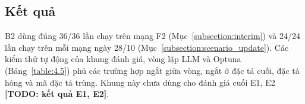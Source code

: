 \documentclass[../DoAn.tex]{subfiles}
\begin{document}
\subsection{Kết quả}

B2 dùng đúng 36/36 lần chạy trên mạng F2 (Mục~\ref{subsection:interim}) và 24/24 lần chạy trên mỗi mạng ngày 28/10 (Mục~\ref{subsection:scenario_update}). Các kiểm thử tự động của khung đánh giá, vòng lặp LLM và Optuna (Bảng~\ref{table:4.5}) phủ các trường hợp ngắt giữa vòng, ngắt ở đặc tả cuối, đặc tả hỏng và mã đặc tả trùng. Khung này chưa dùng cho đánh giá cuối E1, E2 \textbf{[TODO: kết quả E1, E2]}.
\end{document}
